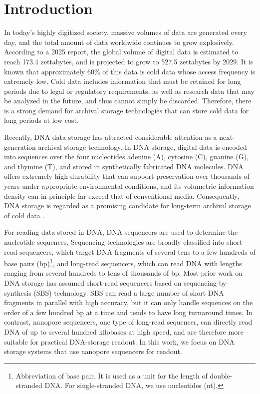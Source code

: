 \documentclass[sotsuron]{kuee}
\begin{document}
\section{Introduction}
In today's highly digitized society, massive volumes of data are generated every day,
and the total amount of data worldwide continues to grow explosively.
According to a 2025 report, the global volume of digital data is estimated to reach
173.4 zettabytes, and is projected to grow to 527.5 zettabytes by 2029\cite{statista_worldwide_data_created}.
It is known that approximately 60\% of this data is cold data whose access frequency is extremely low\cite{dna_data_storage_alliance_2021_intro}.
Cold data includes information that must be retained for long periods due to legal or regulatory requirements,
as well as research data that may be analyzed in the future, and thus cannot simply be discarded.
Therefore, there is a strong demand for archival storage technologies that can store cold data for long periods
at low cost\cite{reinsel2017dataage2025,dna_data_storage_alliance_2021_intro}.

Recently, DNA data storage has attracted considerable attention as a next-generation archival storage technology.
In DNA storage, digital data is encoded into sequences over the four nucleotides
adenine (A), cytosine (C), guanine (G), and thymine (T), and stored in synthetically fabricated DNA molecules.
DNA offers extremely high durability that can support preservation over thousands of years under appropriate
environmental conditions, and its volumetric information density can in principle far exceed that of conventional media.
Consequently, DNA storage is regarded as a promising candidate for long-term archival storage of cold data
\cite{akash2024_applicable,Ceze2019,dna_data_storage_alliance_2021_intro}.

For reading data stored in DNA, DNA sequencers are used to determine the nucleotide sequences\cite{Ceze2019}.
Sequencing technologies are broadly classified into short-read sequencers, which target DNA fragments of
several tens to a few hundreds of base pairs (bp)\footnote{Abbreviation of base pair. It is used as a unit for the
length of double-stranded DNA. For single-stranded DNA, we use nucleotides (nt).},
and long-read sequencers, which can read DNA with lengths ranging from several hundreds to tens of thousands of bp\cite{Amarasinghe2020}.
Most prior work on DNA storage has assumed short-read sequencers based on sequencing-by-synthesis (SBS) technology\cite{SBS}.
SBS can read a large number of short DNA fragments in parallel with high accuracy,
but it can only handle sequences on the order of a few hundred bp at a time and tends to have long turnaround times\cite{SBS}.
In contrast, nanopore sequencers, one type of long-read sequencer, can directly read DNA of up to several hundred kilobases
at high speed, and are therefore more suitable for practical DNA-storage readout\cite{Amarasinghe2020}.
In this work, we focus on DNA storage systems that use nanopore sequencers for readout.
\end{document}
